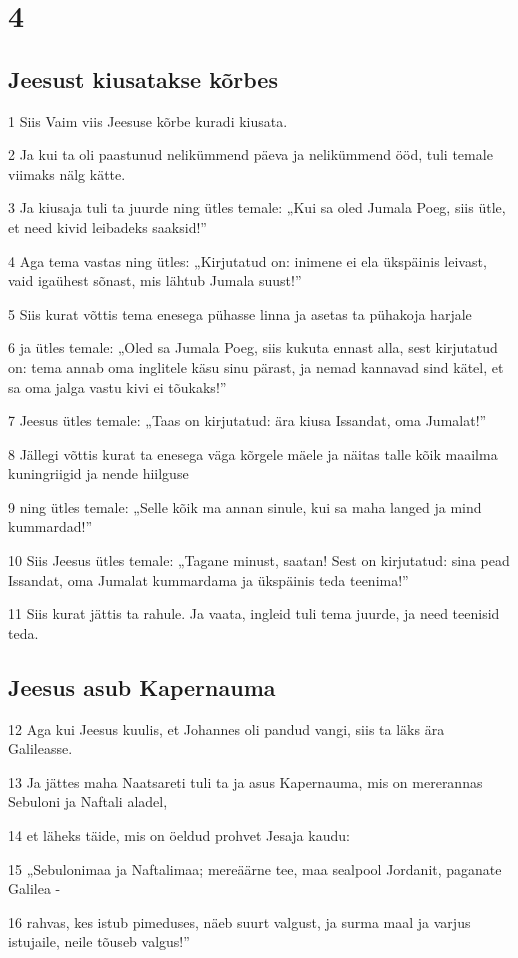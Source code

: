 \chapter{4}

\section*{Jeesust kiusatakse kõrbes}

\par 1 Siis Vaim viis Jeesuse kõrbe kuradi kiusata.
\par 2 Ja kui ta oli paastunud nelikümmend päeva ja nelikümmend ööd, tuli temale viimaks nälg kätte.
\par 3 Ja kiusaja tuli ta juurde ning ütles temale: „Kui sa oled Jumala Poeg, siis ütle, et need kivid leibadeks saaksid!”
\par 4 Aga tema vastas ning ütles: „Kirjutatud on: inimene ei ela ükspäinis leivast, vaid igaühest sõnast, mis lähtub Jumala suust!”
\par 5 Siis kurat võttis tema enesega pühasse linna ja asetas ta pühakoja harjale
\par 6 ja ütles temale: „Oled sa Jumala Poeg, siis kukuta ennast alla, sest kirjutatud on: tema annab oma inglitele käsu sinu pärast, ja nemad kannavad sind kätel, et sa oma jalga vastu kivi ei tõukaks!”
\par 7 Jeesus ütles temale: „Taas on kirjutatud: ära kiusa Issandat, oma Jumalat!”
\par 8 Jällegi võttis kurat ta enesega väga kõrgele mäele ja näitas talle kõik maailma kuningriigid ja nende hiilguse
\par 9 ning ütles temale: „Selle kõik ma annan sinule, kui sa maha langed ja mind kummardad!”
\par 10 Siis Jeesus ütles temale: „Tagane minust, saatan! Sest on kirjutatud: sina pead Issandat, oma Jumalat kummardama ja ükspäinis teda teenima!”
\par 11 Siis kurat jättis ta rahule. Ja vaata, ingleid tuli tema juurde, ja need teenisid teda.

\section*{Jeesus asub Kapernauma}

\par 12 Aga kui Jeesus kuulis, et Johannes oli pandud vangi, siis ta läks ära Galileasse.
\par 13 Ja jättes maha Naatsareti tuli ta ja asus Kapernauma, mis on mererannas Sebuloni ja Naftali aladel,
\par 14 et läheks täide, mis on öeldud prohvet Jesaja kaudu:
\par 15 „Sebulonimaa ja Naftalimaa; mereäärne tee, maa sealpool Jordanit, paganate Galilea -
\par 16 rahvas, kes istub pimeduses, näeb suurt valgust, ja surma maal ja varjus istujaile, neile tõuseb valgus!”

